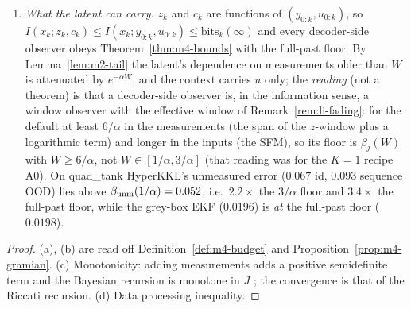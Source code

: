\begin{proposition}
\begin{enumerate}
\item[(d)] \emph{What the latent can carry.} $z_k$ and $c_k$ are functions of $(y_{0:k},u_{0:k})$, so
$I(x_k;z_k,c_k)\le I(x_k;y_{0:k},u_{0:k})\le\mathrm{bits}_k(\infty)$ and every decoder-side observer obeys
Theorem~\ref{thm:m4-bounds} with the full-past floor. By Lemma~\ref{lem:m2-tail} the latent's dependence on
measurements older than $W$ is attenuated by $e^{-\alpha W}$, and the context carries $u$ only; the \emph{reading}
(not a theorem)  is that a decoder-side observer is, in the information sense, a window
observer with the effective window of Remark~\ref{rem:li-fading}: for the default at least $6/\alpha$ in the measurements
(the span of the $z$-window plus a logarithmic term) and longer in the inputs (the SFM), so its floor is $\beta_j(W)$ with
$W\ge6/\alpha$, not $W\in[1/\alpha,3/\alpha]$ (that reading was for the $K=1$ recipe A0). On quad\_tank HyperKKL's unmeasured error ($0.067$ id, $0.093$ sequence OOD) lies above
$\beta_{\rm unm}(1/\alpha)=0.052$, i.e.\ $2.2\times$ the $3/\alpha$ floor and $3.4\times$ the full-past floor, while the
grey-box EKF ($0.0196$) is \emph{at} the full-past floor ($0.0198$).
\end{enumerate}
\end{proposition}
\begin{proof}
(a), (b) are read off Definition~\ref{def:m4-budget} and Proposition~\ref{prop:m4-gramian}. (c) Monotonicity:
adding measurements adds a positive semidefinite term and the Bayesian recursion is monotone in $J$
\citep{tichavsky1998posterior}; the convergence is that of the Riccati recursion. (d) Data processing inequality.
\end{proof}

